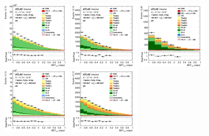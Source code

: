 \begin{figure}[h!]
\center
\includegraphics[width=0.32\textwidth]{Images/VH/SRsandTopCRs/Region_distmva_DSR_BMax250_L1_Y6051_TTypent_T1_J2_BMin150_Prefit.png}
\includegraphics[width=0.32\textwidth]{Images/VH/SRsandTopCRs/Region_distmva_DSR_BMax250_L1_Y6051_TTypelt_T2_J2_BMin150_Prefit.png}
\includegraphics[width=0.32\textwidth]{Images/VH/SRsandTopCRs/Region_distmva_DSR_BMax250_L1_Y6051_TTypett_T2_J2_BMin150_Prefit.png}\\
\includegraphics[width=0.32\textwidth]{Images/VH/SRsandTopCRs/Region_distmva_DSR_BMax250_L1_Y6051_TTypent_T1_J3_BMin150_Prefit.png}
\includegraphics[width=0.32\textwidth]{Images/VH/SRsandTopCRs/Region_distmva_DSR_BMax250_L1_Y6051_TTypelt_T2_J3_BMin150_Prefit.png}

\end{figure}
